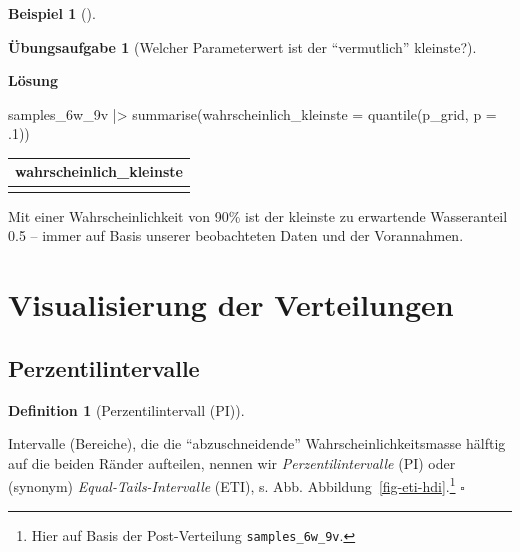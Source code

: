 \documentclass[
  ngerman,
  letterpaper,
  twoside,
  open=any]{scrbook}
\newenvironment{Shaded}{\begin{snugshade}}{\end{snugshade}}
\newcommand{\AttributeTok}[1]{\textcolor[rgb]{0.40,0.45,0.13}{#1}}
\newcommand{\DecValTok}[1]{\textcolor[rgb]{0.68,0.00,0.00}{#1}}
\newcommand{\FunctionTok}[1]{\textcolor[rgb]{0.28,0.35,0.67}{#1}}
\newcommand{\NormalTok}[1]{\textcolor[rgb]{0.00,0.23,0.31}{#1}}
\newcommand{\SpecialCharTok}[1]{\textcolor[rgb]{0.37,0.37,0.37}{#1}}
\newcounter{none} %
\theoremstyle{definition}
\newtheorem{example}{Beispiel}[chapter]
\theoremstyle{plain}
\theoremstyle{definition}
\newtheorem{exercise}{Übungsaufgabe}[chapter]
\theoremstyle{definition}
\newtheorem{definition}{Definition}[chapter]
\theoremstyle{remark}
\begin{document}
\begin{example}[]
\begin{exercise}[Welcher Parameterwert ist der \enquote{vermutlich}
kleinste?]
\begin{tcolorbox}[enhanced jigsaw, arc=.35mm, bottomrule=.15mm, breakable, colback=white, colframe=quarto-callout-tip-color-frame, left=2mm, leftrule=.75mm, opacityback=0, rightrule=.15mm, toprule=.15mm]
\vspace{-3mm}\textbf{Lösung}\vspace{3mm}

\begin{Shaded}
\begin{Highlighting}[]
\NormalTok{samples\_6w\_9v }\SpecialCharTok{|\textgreater{}} 
  \FunctionTok{summarise}\NormalTok{(}\AttributeTok{wahrscheinlich\_kleinste =} 
              \FunctionTok{quantile}\NormalTok{(p\_grid, }\AttributeTok{p =}\NormalTok{ .}\DecValTok{1}\NormalTok{))}
\end{Highlighting}
\end{Shaded}

{\def\LTcaptype{none} %
\begin{longtable}[]{@{}r@{}}
\toprule\noalign{}
wahrscheinlich\_kleinste \\
\midrule\noalign{}
\endhead
\bottomrule\noalign{}
\endlastfoot
0.5 \\
\end{longtable}
}

Mit einer Wahrscheinlichkeit von 90\% ist der kleinste zu erwartende
Wasseranteil 0.5 -- immer auf Basis unserer beobachteten Daten und der
Vorannahmen.

\end{tcolorbox}

\end{exercise}

\section{Visualisierung der
Verteilungen}\label{visualisierung-der-verteilungen}

\subsection{Perzentilintervalle}\label{perzentilintervalle}

\begin{definition}[Perzentilintervall
(PI)]\protect\hypertarget{def-eti}{}\label{def-eti}

Intervalle (Bereiche), die die \enquote{abzuschneidende}
Wahrscheinlichkeitsmasse hälftig auf die beiden Ränder aufteilen, nennen
wir \emph{Perzentilintervalle} (PI) oder (synonym)
\emph{Equal-Tails-Intervalle} (ETI), s. Abb.
Abbildung~\ref{fig-eti-hdi}.\footnote{Hier auf Basis der Post-Verteilung
  \texttt{samples\_6w\_9v}.} \(\square\)

\end{definition}


\end{example}
\end{document}
